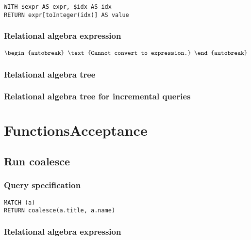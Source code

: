 \begin{lstlisting}
WITH $expr AS expr, $idx AS idx
RETURN expr[toInteger(idx)] AS value
\end{lstlisting}

\subsubsection*{Relational algebra expression}

\begin{align*}
\begin{autobreak}
\text{Cannot convert to expression.}
\end{autobreak}
\end{align*}

\subsubsection*{Relational algebra tree}


\subsubsection*{Relational algebra tree for incremental queries}

\section{FunctionsAcceptance}


\subsection{Run coalesce}

\subsubsection*{Query specification}

\begin{lstlisting}
MATCH (a)
RETURN coalesce(a.title, a.name)
\end{lstlisting}

\subsubsection*{Relational algebra expression}

